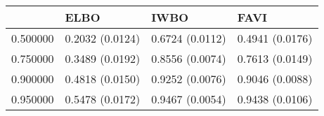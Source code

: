 \begin{tabular}{llll}
\toprule
 & ELBO & IWBO & FAVI \\
\midrule
0.500000 & 0.2032 (0.0124) & 0.6724 (0.0112) & 0.4941 (0.0176) \\
0.750000 & 0.3489 (0.0192) & 0.8556 (0.0074) & 0.7613 (0.0149) \\
0.900000 & 0.4818 (0.0150) & 0.9252 (0.0076) & 0.9046 (0.0088) \\
0.950000 & 0.5478 (0.0172) & 0.9467 (0.0054) & 0.9438 (0.0106) \\
\bottomrule
\end{tabular}
